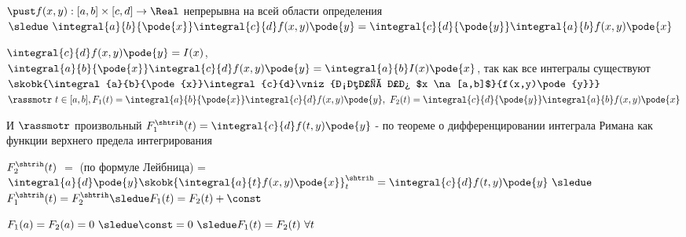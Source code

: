\begin{proofs}

	$\pust f(x,y): [a,b]\times [c,d] \to \Real$ непрерывна на всей области определения  $\sledue \ \integral{a}{b}{\pode{x}}\integral{c}{d}f(x,y)\pode{y} = \integral{c}{d}{\pode{y}}\integral{a}{b}f(x,y)\pode{x}$
	\begin{dokvo}
		$\integral{c}{d}f(x,y)\pode{y} = I(x)$, $\integral{a}{b}{\pode{x}}\integral{c}{d}f(x,y)\pode{y} = \integral{a}{b}I(x)\pode{x}$,
		так как все интегралы существуют $\skobk{\integral{a}{b}{\pode{x}}\integral{c}{d}\vniz{непр по $x \na [a,b]$}{f(x,y)\pode{y}}}$
		$\rassmotr \ t \in [a,b], F_1(t) = \integral{a}{b}{\pode{x}}\integral{c}{d}f(x,y)\pode{y}, \ F_2(t) = \integral{c}{d}{\pode{y}}\integral{a}{b}f(x,y)\pode{x}$

		И $\rassmotr$ произвольный $F^{\shtrih}_1(t)= \integral{c}{d}f(t,y)\pode{y}$ - по теореме о дифференцировании интеграла Римана как функции верхнего предела интегрирования

		$F^{\shtrih}_2(t)$ $=$ (по формуле Лейбница) = $\integral{a}{d}\pode{y}\skobk{\integral{a}{t}f(x,y)\pode{x}}^{\shtrih}_{t} = \integral{c}{d}f(t,y)\pode{y} \ \sledue$ $F^{\shtrih}_1(t) = F^{\shtrih}_2 \sledue F_1(t) = F_2(t) + \const$

		$F_1(a) = F_2(a) = 0 \ \sledue \const = 0 \ \sledue F_1(t) = F_2(t) \ \forall t$
	\end{dokvo}
\end{proofs}
\newpage
